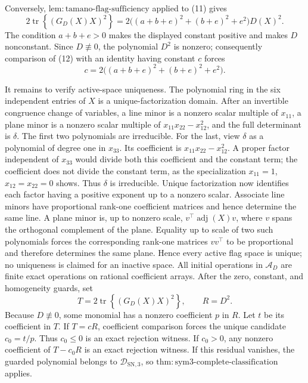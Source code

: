 Conversely, \(\mathrm{lem{:}tamano\text{-}flag\text{-}sufficiency}\)
applied to (11) gives
\[
 2\operatorname{tr}\!\left\{(G_D(X)X)^2\right\}
 =2\bigl((a+b+e)^2+(b+e)^2+e^2\bigr)D(X)^2.                         \tag{12}
\]
The condition \(a+b+e>0\) makes the displayed constant positive and
makes \(D\) nonconstant.  Since \(D\not\equiv0\), the polynomial
\(D^2\) is nonzero; consequently comparison of (12) with an identity
having constant \(c\) forces
\[
 c=2\bigl((a+b+e)^2+(b+e)^2+e^2\bigr).
\]

It remains to verify active-space uniqueness.  The polynomial ring in
the six independent entries of \(X\) is a unique-factorization domain.
After an invertible congruence change of variables, a line minor is a
nonzero scalar multiple of \(x_{11}\), a plane minor is a nonzero
scalar multiple of \(x_{11}x_{22}-x_{12}^2\), and the full determinant
is \(\delta\).  The first two polynomials are irreducible.  For the last,
view \(\delta\) as a polynomial of degree one in \(x_{33}\).  Its
coefficient is \(x_{11}x_{22}-x_{12}^2\).  A proper factor independent
of \(x_{33}\) would divide both this coefficient and the constant term;
the coefficient does not divide the constant term, as the specialization
\(x_{11}=1\), \(x_{12}=x_{22}=0\) shows.  Thus \(\delta\) is
irreducible.  Unique factorization now identifies each factor having a
positive exponent up to a nonzero scalar.  Associate line minors have
proportional rank-one coefficient matrices and hence determine the same
line.  A plane minor is, up to nonzero scale,
\(v^{\top}\operatorname{adj}(X)v\), where \(v\) spans the orthogonal
complement of the plane.  Equality up to scale of two such polynomials
forces the corresponding rank-one matrices \(vv^{\top}\) to be
proportional and therefore determines the same plane.  Hence every
active flag space is unique; no uniqueness is claimed for an inactive
space.
All initial operations in \(\mathcal A_D\) are finite exact operations
on rational coefficient arrays.  After the zero, constant, and
homogeneity guards, set
\[
 T=2\operatorname{tr}\!\left\{(G_D(X)X)^2\right\},
 \qquad R=D^2.
\]
Because \(D\not\equiv0\), some monomial has a nonzero coefficient
\(p\) in \(R\).  Let \(t\) be its coefficient in \(T\).  If
\(T=cR\), coefficient comparison forces the unique candidate
\(c_0=t/p\).  Thus \(c_0\leq0\) is an exact rejection witness.  If
\(c_0>0\), any nonzero coefficient of \(T-c_0R\) is an exact rejection
witness.  If this residual vanishes, the guarded polynomial belongs to
\(\mathcal D_{\mathrm{SN},3}\), so
\(\mathrm{thm{:}sym3\text{-}complete\text{-}classification}\) applies.

